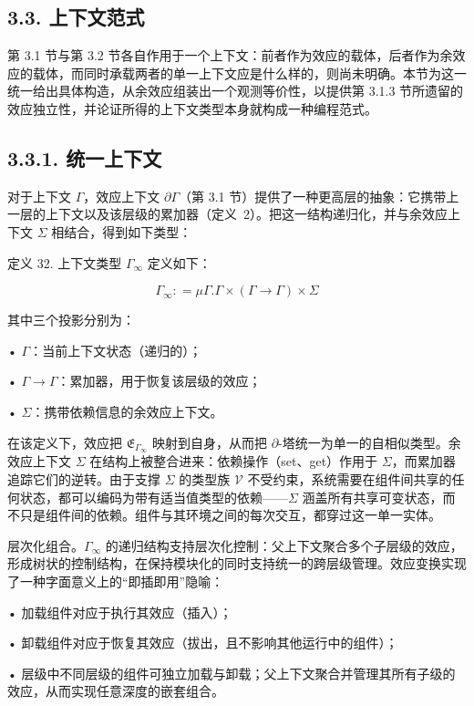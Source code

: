 \subsection{3.3. 上下文范式}\label{the-context-paradigm}

第 3.1 节与第 3.2 节各自作用于一个上下文：前者作为效应的载体，后者作为余效应的载体，而同时承载两者的单一上下文应是什么样的，则尚未明确。本节为这一统一给出具体构造，从余效应组装出一个观测等价性，以提供第 3.1.3 节所遗留的效应独立性，并论证所得的上下文类型本身就构成一种编程范式。

\subsection{3.3.1. 统一上下文}\label{unified-context}

对于上下文 $\Gamma$，效应上下文 $\partial \Gamma$（第 3.1 节）提供了一种更高层的抽象：它携带上一层的上下文以及该层级的累加器（定义~2）。把这一结构递归化，并与余效应上下文 $\Sigma$ 相结合，得到如下类型：

定义 32. 上下文类型 \(\Gamma _ { \infty }\) 定义如下：

\[
\Gamma _ { \infty } : = \mu \Gamma . \Gamma \times ( \Gamma \to \Gamma ) \times \Sigma\tag{31}
\]

其中三个投影分别为：

• \(\Gamma\)：当前上下文状态（递归的）；

• \(\Gamma \to \Gamma\)：累加器，用于恢复该层级的效应；

• \(\Sigma\)：携带依赖信息的余效应上下文。

在该定义下，效应把 \(\mathfrak { E } _ { \Gamma _ { \infty } }\) 映射到自身，从而把 $\partial$-塔统一为单一的自相似类型。余效应上下文 $\Sigma$ 在结构上被整合进来：依赖操作（set、get）作用于 $\Sigma$，而累加器追踪它们的逆转。由于支撑 $\Sigma$ 的类型族 $\mathcal{V}$ 不受约束，系统需要在组件间共享的任何状态，都可以编码为带有适当值类型的依赖——$\Sigma$ 涵盖所有共享可变状态，而不只是组件间的依赖。组件与其环境之间的每次交互，都穿过这一单一实体。

层次化组合。\(\Gamma _ { \infty }\) 的递归结构支持层次化控制：父上下文聚合多个子层级的效应，形成树状的控制结构，在保持模块化的同时支持统一的跨层级管理。效应变换实现了一种字面意义上的“即插即用”隐喻：

• 加载组件对应于执行其效应（插入）；

• 卸载组件对应于恢复其效应（拔出，且不影响其他运行中的组件）；

• 层级中不同层级的组件可独立加载与卸载；父上下文聚合并管理其所有子级的效应，从而实现任意深度的嵌套组合。

